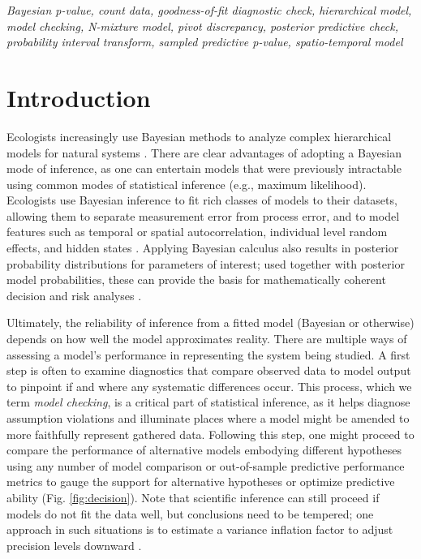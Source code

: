 \documentclass[12pt,english]{article}
\begin{document}
\begin{spacing}{1.9}
{\em Bayesian p-value, count data, goodness-of-fit diagnostic check, hierarchical model, model checking, N-mixture model, pivot discrepancy, posterior predictive check, probability interval transform, sampled predictive p-value, spatio-temporal model}



\def\VAR{{\rm Var}\,}
\def\COV{{\rm Cov}\,}
\def\Prob{{\rm P}\,}
\def\bfx{{\bf x}}
\def\bfX{{\bf X}}
\def\bfY{{\bf Y}\,}
\def\bfy{{\bf y}}
\def\bfZ{{\bf Z}\,}
\def\bftheta{\boldsymbol{\theta}}
\def\bfeta{\boldsymbol{\eta}}
\def\bfOmega{\boldsymbol{\Omega}}
\def\bfbeta{\boldsymbol{\beta}}
\def\bfSigma{\boldsymbol{\Sigma}}
\def\bfmu{\boldsymbol{\mu}}
\def\bfnu{\boldsymbol{\nu}}
\def\bfepsilon{\boldsymbol{\epsilon}}
\def\R2{\rm I\!R^2}


\section{Introduction}

Ecologists increasingly use Bayesian methods to analyze complex hierarchical models for natural systems \citep{HobbsHooten2015}.  There are clear advantages of adopting a Bayesian mode of inference, as one can entertain models that were previously intractable using common modes of statistical inference (e.g., maximum likelihood). Ecologists use Bayesian inference to fit rich classes of models to their datasets, allowing them to separate measurement error from process error, and to model features such as temporal or spatial autocorrelation, individual level random effects, and hidden states \citep{LinkEtAl2002,ClarkBjornstad2004,CressieEtAl2009}. Applying Bayesian calculus also results in posterior probability distributions for parameters of interest; used together with posterior model probabilities, these can provide the basis for mathematically coherent decision and risk analyses \citep{LinkBarker2006,Berger2013,WilliamsHootenInPress}.

Ultimately, the reliability of inference from a fitted model (Bayesian or otherwise) depends on how well the model approximates reality.  There are multiple ways of assessing a model's performance in representing the system being studied. A first step is often to examine diagnostics that compare observed data to model output to pinpoint if and where any systematic differences occur. This process, which we term \textit{model checking}, is a critical part of statistical inference, as it helps diagnose assumption violations and illuminate places where a model might be amended to more faithfully represent gathered data. Following this step, one might proceed to compare the performance of alternative models embodying different hypotheses using any number of model comparison or out-of-sample predictive performance metrics \citep[see][for a review]{HootenHobbs2015} to gauge the support for alternative hypotheses or optimize predictive ability (Fig. \ref{fig:decision}).  Note that scientific inference can still proceed if models do not fit the data well, but conclusions need to be tempered; one approach in such situations is to estimate a variance inflation factor to adjust precision levels downward \citep[e.g.,][]{CoxSnell1989,McCullaghNelder1989}.


\end{spacing}
\end{document}
